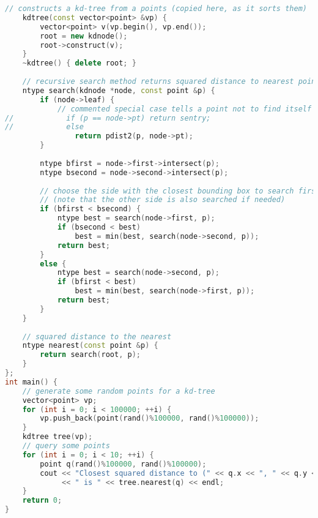 \begin{lstlisting}[language=C++]
    // constructs a kd-tree from a points (copied here, as it sorts them)
    kdtree(const vector<point> &vp) {
        vector<point> v(vp.begin(), vp.end());
        root = new kdnode();
        root->construct(v);
    }
    ~kdtree() { delete root; }
    
    // recursive search method returns squared distance to nearest point
    ntype search(kdnode *node, const point &p) {
        if (node->leaf) {
            // commented special case tells a point not to find itself
//            if (p == node->pt) return sentry;
//            else               
                return pdist2(p, node->pt);
        }
        
        ntype bfirst = node->first->intersect(p);
        ntype bsecond = node->second->intersect(p);
        
        // choose the side with the closest bounding box to search first
        // (note that the other side is also searched if needed)
        if (bfirst < bsecond) {
            ntype best = search(node->first, p);
            if (bsecond < best)
                best = min(best, search(node->second, p));
            return best;
        }
        else {
            ntype best = search(node->second, p);
            if (bfirst < best)
                best = min(best, search(node->first, p));
            return best;
        }
    }
    
    // squared distance to the nearest 
    ntype nearest(const point &p) {
        return search(root, p);
    }
};
int main() {
    // generate some random points for a kd-tree
    vector<point> vp;
    for (int i = 0; i < 100000; ++i) {
        vp.push_back(point(rand()%100000, rand()%100000));
    }
    kdtree tree(vp);
    // query some points
    for (int i = 0; i < 10; ++i) {
        point q(rand()%100000, rand()%100000);
        cout << "Closest squared distance to (" << q.x << ", " << q.y << ")"
             << " is " << tree.nearest(q) << endl;
    }
    return 0;
}
\end{lstlisting}
